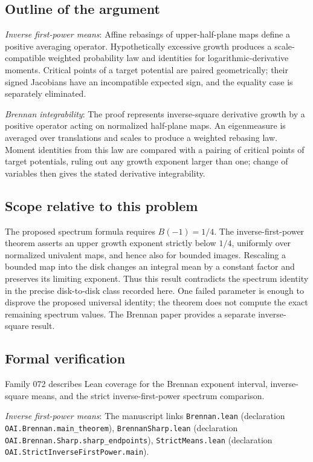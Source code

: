\documentclass[11pt]{article}
\begin{document}
\subsection{Outline of the argument}
\textit{Inverse first-power means}: Affine rebasings of upper-half-plane maps define a positive averaging operator. Hypothetically excessive growth produces a scale-compatible weighted probability law and identities for logarithmic-derivative moments. Critical points of a target potential are paired geometrically; their signed Jacobians have an incompatible expected sign, and the equality case is separately eliminated.

\textit{Brennan integrability}: The proof represents inverse-square derivative growth by a positive operator acting on normalized half-plane maps. An eigenmeasure is averaged over translations and scales to produce a weighted rebasing law. Moment identities from this law are compared with a pairing of critical points of target potentials, ruling out any growth exponent larger than one; change of variables then gives the stated derivative integrability.

\subsection{Scope relative to this problem}
The proposed spectrum formula requires $B(-1)=1/4$. The inverse-first-power theorem asserts an upper growth exponent strictly below $1/4$, uniformly over normalized univalent maps, and hence also for bounded images. Rescaling a bounded map into the disk changes an integral mean by a constant factor and preserves its limiting exponent. Thus this result contradicts the spectrum identity in the precise disk-to-disk class recorded here. One failed parameter is enough to disprove the proposed universal identity; the theorem does not compute the exact remaining spectrum values. The Brennan paper provides a separate inverse-square result.

\subsection{Formal verification}
Family 072 describes Lean coverage for the Brennan exponent interval, inverse-square means, and the strict inverse-first-power spectrum comparison.

\textit{Inverse first-power means}: The manuscript links \texttt{Brennan.lean} (declaration \texttt{OAI.Brennan.main\_theorem}), \texttt{BrennanSharp.lean} (declaration \texttt{OAI.Brennan.Sharp.sharp\_endpoints}), \texttt{StrictMeans.lean} (declaration \texttt{OAI.StrictInverseFirstPower.main}).
\end{document}
